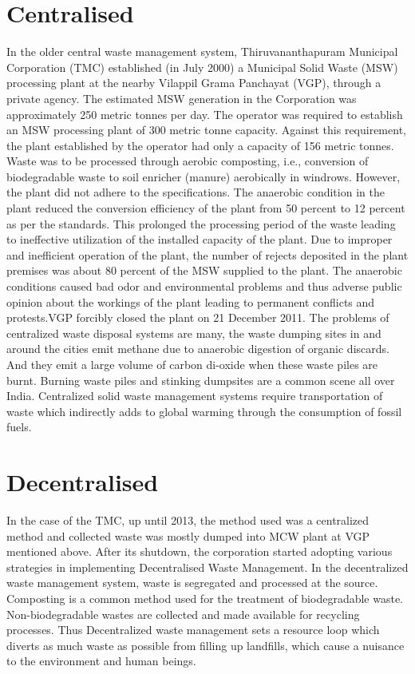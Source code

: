 \documentclass[12pt,a4paper]{  report}
\begin{document}
\section{Centralised}
\begin{justify}
	In the older central waste management system, Thiruvananthapuram Municipal Corporation (TMC) established (in July 2000) a Municipal Solid Waste (MSW) processing plant at the nearby Vilappil Grama Panchayat (VGP), through a private agency. The estimated MSW generation in the Corporation was approximately 250 metric tonnes per day. The operator was required to establish an MSW processing plant of 300 metric tonne capacity. Against this requirement, the plant established by the operator had only a capacity of 156 metric tonnes. Waste was to be processed through aerobic composting, i.e., conversion of biodegradable waste to soil enricher (manure) aerobically in windrows. However, the plant did not adhere to the specifications. The anaerobic condition in the plant reduced the conversion efficiency of the plant from 50 percent to 12 percent as per the standards. This prolonged the processing period of the waste leading to ineffective utilization of the installed capacity of the plant. Due to improper and inefficient operation of the plant, the number of rejects deposited in the plant premises was about 80 percent of the MSW supplied to the plant. The anaerobic conditions caused bad odor and environmental problems and thus adverse public opinion about the workings of the plant leading to permanent conflicts and protests.VGP forcibly closed the plant on 21 December 2011.
	The problems of centralized waste disposal systems are many, the waste dumping sites in and around the cities emit methane due to anaerobic digestion of organic discards. And they emit a large volume of carbon di-oxide when these waste piles are burnt. Burning waste piles and stinking dumpsites are a common scene all over India. Centralized solid waste management systems require transportation of waste which indirectly adds to global warming through the consumption of fossil fuels.
	
\end{justify}
\section{Decentralised}
\begin{justify}
	In the case of the TMC, up until 2013, the method used was a centralized method and collected waste was mostly dumped into MCW plant at VGP mentioned above. After its shutdown,  the corporation started adopting various strategies in implementing Decentralised Waste Management. In the decentralized waste management system, waste is segregated and processed at the source. Composting is a common method used for the treatment of biodegradable waste. Non-biodegradable wastes are collected and made available for recycling processes. Thus Decentralized waste management sets a resource loop which diverts as much waste as possible from filling up landfills, which cause a nuisance to the environment and human beings.
	
\end{justify}
\end{document}

